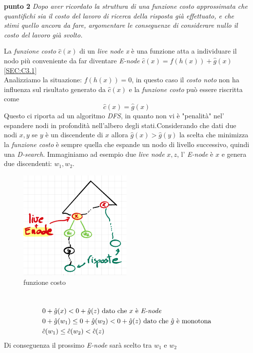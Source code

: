 \documentclass[a4paper]{article}
\begin{document}
\textbf{punto 2}
\emph{Dopo aver ricordato la struttura di una funzione costo approssimata che quantifichi sia il costo del lavoro di ricerca della risposta già effettuato, e che stimi quello ancora da fare, argomentare le conseguenze di considerare nullo il costo del lavoro già svolto.}
\begin{adjustwidth}{.8cm}{0cm}
	La \textit{funzione costo} $\hat c(x)$ di un \textit{live node x} è una funzione atta a individuare il nodo più conveniente da far diventare \textit{E-node} $\hat c(x) = f(h(x)) + \hat g(x)$ \ref{SEC:C3.1}\\
Analizziamo la situazione: $f(h(x)) =0$, in questo caso il \textit{costo noto} non ha influenza sul risultato generato da $\hat c(x)$ e la \textit{funzione costo} può essere riscritta come $$\hat c(x) = \hat g(x)$$
Questo ci riporta ad un algoritmo \textit{DFS}, in quanto non vi è "penalità" nel' espandere nodi in profondità nell'albero degli stati.Considerando che dati due nodi $x,y$ se $y$ è un discendente di $x$ allora $\hat g(x) > \hat g(y)$ la scelta che minimizza la \textit{funzione costo} è sempre quella che espande un nodo di livello successivo, quindi una \textit{D-search}.
Immaginiamo ad esempio due \textit{live node} $x,z$, l' \textit{E-node} è $x$ e genera due discendenti: $w_1, w_2$.\\
\begin{figure}[!ht]
\centering
\includegraphics[width=0.5\textwidth]{./img/C3_next.png}
\caption{funzione costo} \label{FIG:C3_next1}
\end{figure}\\

		\begin{align}
			&0 + \hat g(x) < 0 + \hat g(z) \text{ dato che $x$ è \textit{E-node}} \notag \\
			&0 + \hat g(w_1) \leq 0 + \hat g(w_2) < 0 + \hat g(z) \text{ dato che $\hat g$ è monotona} \notag\\
			&\hat c(w_1) \leq \hat c(w_2) < \hat c(z) \notag
	        \end{align}
		Di conseguenza il prossimo \textit{E-node} sarà scelto tra $w_1$ e $w_2$
\end{adjustwidth}
\end{document}
